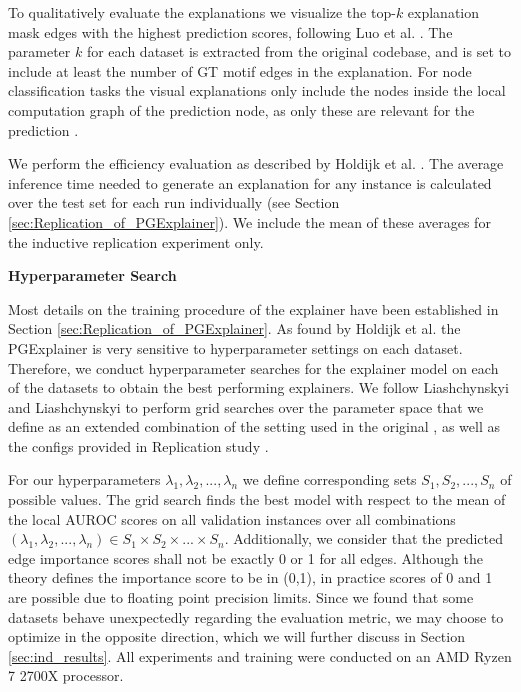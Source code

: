 To qualitatively evaluate the explanations we visualize the top-$k$ explanation mask edges with the highest prediction scores, following Luo et al. \cite{luo2020parameterized}. The parameter $k$ for each dataset is extracted from the original codebase, and is set to include at least the number of \ac{GT} motif edges in the explanation. For node classification tasks the visual explanations only include the nodes inside the local computation graph of the prediction node, as only these are relevant for the prediction \cite{ying2019gnnexplainer}. \bigskip

We perform the efficiency evaluation as described by Holdijk et al. \cite{holdijk2021re}. The average inference time needed to generate an explanation for any instance is calculated over the test set for each run individually (see Section \ref{sec:Replication_of_PGExplainer}). We include the mean of these averages for the inductive replication experiment only. \bigskip

\textbf{Hyperparameter Search}\par
Most details on the training procedure of the explainer have been established in Section \ref{sec:Replication_of_PGExplainer}. As found by Holdijk et al. \cite{holdijk2021re} the PGExplainer is very sensitive to hyperparameter settings on each dataset. Therefore, we conduct hyperparameter searches for the explainer model on each of the datasets to obtain the best performing explainers. We follow Liashchynskyi and Liashchynskyi \cite{liashchynskyi2019grid} to perform grid searches over the parameter space that we define as an extended combination of the setting used in the original \cite{luo2020parameterized}, as well as the configs provided in Replication study \cite{holdijk2021re}. 

For our hyperparameters $\lambda_1,\lambda_2,...,\lambda_n$ we define corresponding sets $S_1,S_2,...,S_n$ of possible values. The grid search finds the best model with respect to the mean of the local AUROC scores on all validation instances over all combinations $(\lambda_1,\lambda_2,...,\lambda_n) \in S_1\times S_2 \times...\times S_n$. Additionally, we consider that the predicted edge importance scores shall not be exactly 0 or 1 for all edges. Although the theory defines the importance score to be in (0,1), in practice scores of 0 and 1 are possible due to floating point precision limits. Since we found that some datasets behave unexpectedly regarding the evaluation metric, we may choose to optimize in the opposite direction, which we will further discuss in Section \ref{sec:ind_results}. All experiments and training were conducted on an AMD Ryzen 7 2700X processor. \bigskip

